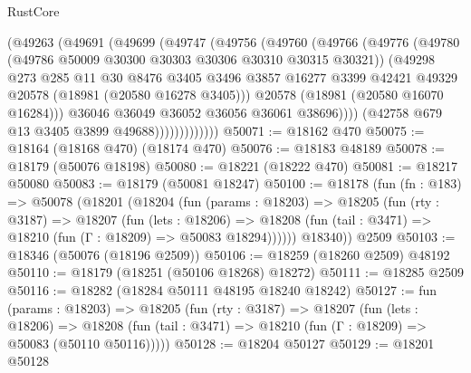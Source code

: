 \begin{lexlean}{RustCore}
\begin{coremodule}
                      (@49263
                        (@49691
                          (@49699
                            (@49747
                              (@49756
                                (@49760
                                  (@49766
                                    (@49776
                                      (@49780
                                        (@49786 @50009 @30300 @30303 @30306 @30310 @30315 @30321))
                                      (@49298
                                        @273
                                        @285
                                        @11
                                        @30
                                        @8476
                                        @3405
                                        @3496
                                        @3857
                                        @16277
                                        @3399
                                        @42421
                                        @49329
                                        @20578
                                        (@18981 (@20580 @16278 @3405)))
                                      @20578
                                      (@18981 (@20580 @16070 @16284)))
                                    @36046
                                    @36049
                                    @36052
                                    @36056
                                    @36061
                                    @38696))))
                            (@42758 @679 @13 @3405 @3899 @49688)))))))))))))
@50071 := @18162 @470
@50075 := @18164 (@18168 @470) (@18174 @470)
@50076 := @18183 @48189
@50078 := @18179 (@50076 @18198)
@50080 := @18221 (@18222 @470)
@50081 := @18217 @50080
@50083 := @18179 (@50081 @18247)
@50100 := @18178
    (fun (fn : @183) =>
    @50078
      (@18201
        (@18204
          (fun (params : @18203) =>
          @18205
            (fun (rty : @3187) =>
            @18207
              (fun (lets : @18206) =>
              @18208 (fun (tail : @3471) => @18210 (fun (Γ : @18209) => @50083 @18294))))))
        @18340))
    @2509
@50103 := @18346 (@50076 (@18196 @2509))
@50106 := @18259 (@18260 @2509) @48192
@50110 := @18179 (@18251 (@50106 @18268) @18272)
@50111 := @18285 @2509
@50116 := @18282 (@18284 @50111 @48195 @18240 @18242)
@50127 := fun (params : @18203) =>
  @18205
    (fun (rty : @3187) =>
    @18207
      (fun (lets : @18206) =>
      @18208 (fun (tail : @3471) => @18210 (fun (Γ : @18209) => @50083 (@50110 @50116)))))
@50128 := @18204 @50127
@50129 := @18201 @50128

\end{coremodule}
\end{lexlean}
